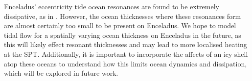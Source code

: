 Enceladus' eccentricity tide ocean resonances are found to be extremely dissipative, as in \citet{tyler2011tidal, matsuyama2014tidal}. However, the ocean thicknesses where these resonances form are almost certainly too small to be present on Enceladus. We hope to model tidal flow for a spatially varying ocean thickness on Enceladus in the future, as this will likely effect resonant thicknesses and may lead to more localised heating at the SPT. Additionally, it is important to incorporate the affects of an icy shell atop these oceans to understand how this limits ocean dynamics and dissipation, which will be explored in future work. 